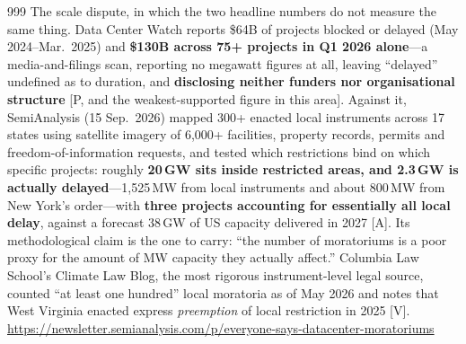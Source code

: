 \begin{thebibliography}{999}
 The scale dispute, in which the two headline numbers do not measure the same thing. Data Center Watch reports \$64B of projects blocked or delayed (May 2024--Mar.\ 2025) and \textbf{\$130B across 75+ projects in Q1 2026 alone}---a media-and-filings scan, reporting no megawatt figures at all, leaving ``delayed'' undefined as to duration, and \textbf{disclosing neither funders nor organisational structure} [P, and the weakest-supported figure in this area]. Against it, SemiAnalysis (15 Sep.\ 2026) mapped 300+ enacted local instruments across 17 states using satellite imagery of 6,000+ facilities, property records, permits and freedom-of-information requests, and tested which restrictions bind on which specific projects: roughly \textbf{20\,GW sits inside restricted areas, and 2.3\,GW is actually delayed}---1,525\,MW from local instruments and about 800\,MW from New York's order---with \textbf{three projects accounting for essentially all local delay}, against a forecast 38\,GW of US capacity delivered in 2027 [A]. Its methodological claim is the one to carry: ``the number of moratoriums is a poor proxy for the amount of MW capacity they actually affect.'' Columbia Law School's Climate Law Blog, the most rigorous instrument-level legal source, counted ``at least one hundred'' local moratoria as of May 2026 and notes that West Virginia enacted express \emph{preemption} of local restriction in 2025 [V]. \url{https://newsletter.semianalysis.com/p/everyone-says-datacenter-moratoriums}


\end{thebibliography}
